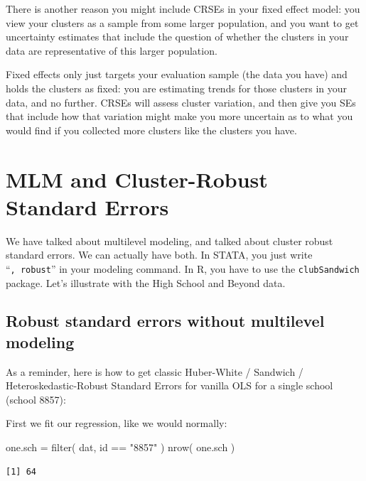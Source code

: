 \documentclass[
  letterpaper,
  DIV=11,
  numbers=noendperiod]{scrreprt}
\newenvironment{Shaded}{}{}
\newcommand{\FunctionTok}[1]{\textcolor[rgb]{0.02,0.16,0.49}{#1}}
\newcommand{\NormalTok}[1]{#1}
\newcommand{\OtherTok}[1]{\textcolor[rgb]{0.00,0.44,0.13}{#1}}
\newcommand{\SpecialCharTok}[1]{\textcolor[rgb]{0.25,0.44,0.63}{#1}}
\newcommand{\StringTok}[1]{\textcolor[rgb]{0.25,0.44,0.63}{#1}}
\begin{document}
There is another reason you might include CRSEs in your fixed effect
model: you view your clusters as a sample from some larger population,
and you want to get uncertainty estimates that include the question of
whether the clusters in your data are representative of this larger
population.

Fixed effects only just targets your evaluation sample (the data you
have) and holds the clusters as fixed: you are estimating trends for
those clusters in your data, and no further. CRSEs will assess cluster
variation, and then give you SEs that include how that variation might
make you more uncertain as to what you would find if you collected more
clusters like the clusters you have.

\chapter{MLM and Cluster-Robust Standard
Errors}\label{mlm-and-cluster-robust-standard-errors}

We have talked about multilevel modeling, and talked about cluster
robust standard errors. We can actually have both. In STATA, you just
write ``\texttt{,\ robust}'' in your modeling command. In R, you have to
use the \texttt{clubSandwich} package. Let's illustrate with the High
School and Beyond data.

\section{Robust standard errors without multilevel
modeling}\label{robust-standard-errors-without-multilevel-modeling}

As a reminder, here is how to get classic Huber-White / Sandwich /
Heteroskedastic-Robust Standard Errors for vanilla OLS for a single
school (school 8857):

First we fit our regression, like we would normally:

\begin{Shaded}
\begin{Highlighting}[]
\NormalTok{one.sch }\OtherTok{=} \FunctionTok{filter}\NormalTok{( dat, id }\SpecialCharTok{==} \StringTok{"8857"}\NormalTok{ )}
\FunctionTok{nrow}\NormalTok{( one.sch )}
\end{Highlighting}
\end{Shaded}

\begin{verbatim}
[1] 64
\end{verbatim}
\end{document}
